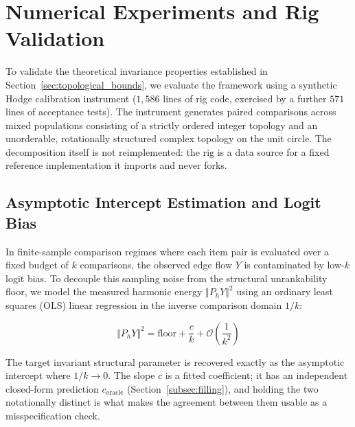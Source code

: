 %

\section{Numerical Experiments and Rig Validation}
\label{sec:numerical_experiments}

To validate the theoretical invariance properties established in
Section~\ref{sec:topological_bounds}, we evaluate the framework using a synthetic
Hodge calibration instrument ($1{,}586$ lines of rig code, exercised by a further
$571$ lines of acceptance tests). The instrument generates paired comparisons
across mixed populations consisting of a strictly ordered integer topology and an
unorderable, rotationally structured complex topology on the unit circle. The
decomposition itself is not reimplemented: the rig is a data source for a fixed
reference implementation it imports and never forks.

\subsection{Asymptotic Intercept Estimation and Logit Bias}
In finite-sample comparison regimes where each item pair is evaluated over a
fixed budget of $k$ comparisons, the observed edge flow $Y$ is contaminated by
low-$k$ logit bias. To decouple this sampling noise from the structural
unrankability floor, we model the measured harmonic energy $\Vert P_h Y \Vert^2$
using an ordinary least squares (OLS) linear regression in the inverse comparison
domain $1/k$:

\begin{equation}
\Vert P_h Y \Vert^2 = \text{floor} + \frac{c}{k}
  + \mathcal{O}\!\left(\frac{1}{k^2}\right)
\label{eq:intercept}
\end{equation}

The target invariant structural parameter is recovered exactly as the asymptotic
intercept where $1/k \to 0$. The slope $c$ is a fitted coefficient; it has an
independent closed-form prediction $c_{\text{oracle}}$ (Section~\ref{subsec:filling}),
and holding the two notationally distinct is what makes the agreement between
them usable as a misspecification check.

